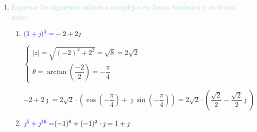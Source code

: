 \begin{enumerate}[label=\color{red}\textbf{\arabic*)}, leftmargin=*]
\begin{enumerate}[label=\color{red}\alph*)]
	$(1-\sqrt{3})^6=\bboxed{64}$
	\item $\textcolor{blue}{(1-\jmath)^8}$
	
	$\begin{cases}
		|z|=\sqrt{1^2+(-1)^2}=\sqrt{2}\\
		\theta=\arctan\left(-\dfrac{1}{1}\right)=-\dfrac{\pi}{4}
	\end{cases}$
	
	$(1-j)^8=(\sqrt{2})^8\cdot\left(\cos\left(8\cdot\left(-\dfrac{\pi}{4}\right)+\jmath\sin\left(8\cdot\left(-\dfrac{\pi}{4}\right)\right)\right)\right)=2^4\cdot(\underbrace{\cos(-2\pi)}_1+\jmath\underbrace{\sin(-2\pi)}_0)=2^4=16$
	
	$(1-j)^8=\bboxed{16}$
	\item $\textcolor{blue}{(-\sqrt{3}+\jmath)^{10}}$
	
	$\begin{cases}
		|z|=\sqrt{(-\sqrt{3})^2+1^2}=\sqrt{4}=2\\
		\theta=\arctan\left(-\dfrac{\sqrt{3}}{1}\right)=-\dfrac{\pi}{3}
	\end{cases}$\\
	$(-\sqrt{3}+\jmath)^{10}=2^{10}\cdot\left(\cos\left(8\cdot\left(-\dfrac{\pi}{3}\right)\right)+\jmath\sin\left(8\cdot\left(-\dfrac{\pi}{3}\right)\right)\right)=2^{10}\cdot\left(\cos\left(-\dfrac{8\pi}{3}\right)+\jmath\sin\left(-\dfrac{8\pi}{3}\right)\right)=2^{10}\cdot\left(\left(-\dfrac{1}{2}\right)+\left(-\dfrac{\sqrt{3}}{2}\right)\jmath\right)=-2^9-2^9\sqrt{3}\jmath$\\
	$(-\sqrt{3}+\jmath)^{10}=\bboxed{-512-512\sqrt{3}\jmath}$
\end{enumerate}

\item \textcolor{lightblue}{Expresar los siguientes números complejos en forma binómica y en forma polar:}
\begin{enumerate}[label=\color{red}\alph*)]
	\item $\textcolor{blue}{(1+\jmath)^3=}-2+2\jmath$
	
	$\begin{cases}
		|z|=\sqrt{(-2)^2+2^2}=\sqrt{8}=2\sqrt{2}\\
		\theta=\arctan\left(\dfrac{-2}{2}\right)=-\dfrac{\pi}{4}
	\end{cases}$
	
	$-2+2\jmath=2\sqrt{2}\cdot\left(\cos\left(-\dfrac{\pi}{4}\right)+\jmath\sin\left(-\dfrac{\pi}{4}\right)\right)=2\sqrt{2}\cdot\left(\dfrac{\sqrt{2}}{2}-\dfrac{\sqrt{2}}{2}\jmath\right)$
	\item $\textcolor{blue}{\jmath^5+\jmath^{16}=}(-1)^8+(-1)^2\cdot\jmath=1+\jmath$
	

\end{enumerate}
\end{enumerate}
